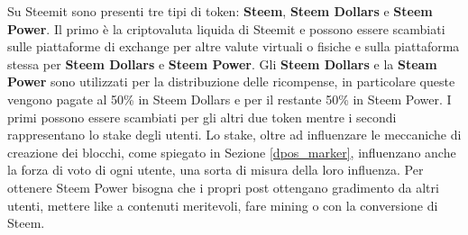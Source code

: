 Su Steemit sono presenti tre tipi di token: \textbf{Steem}, \textbf{Steem Dollars} e \textbf{Steem Power}. Il primo è la criptovaluta liquida di Steemit e possono essere scambiati sulle piattaforme di exchange per altre valute virtuali o fisiche e sulla piattaforma stessa per \textbf{Steem Dollars} e \textbf{Steem Power}.
Gli \textbf{Steem Dollars} e la \textbf{Steam Power} sono utilizzati per la distribuzione delle ricompense, in particolare queste vengono pagate al 50\% in Steem Dollars e per il restante 50\% in Steem Power. I primi possono essere scambiati per gli altri due token mentre i secondi rappresentano lo stake degli utenti. Lo stake, oltre ad influenzare le meccaniche di creazione dei blocchi, come spiegato in Sezione \ref{dpos_marker}, influenzano anche la forza di voto di ogni utente, una sorta di misura della loro influenza. Per ottenere Steem Power bisogna che i propri post ottengano gradimento da altri utenti, mettere like a contenuti meritevoli, fare mining o con la conversione di Steem.

